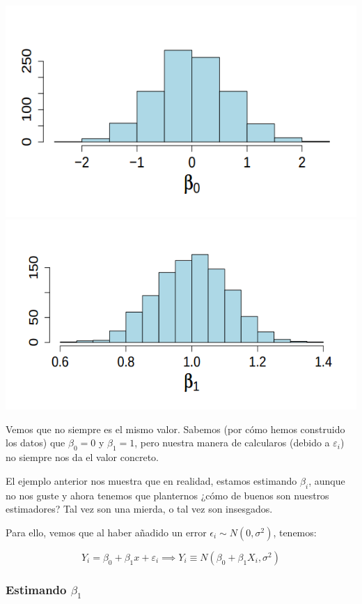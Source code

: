 \documentclass[palatino,nochap]{apuntes}
\begin{document}
\begin{example}
\begin{center}
\includegraphics[scale=0.3]{img/1000vecesb0.png}
\includegraphics[scale=0.3]{img/1000vecesb1.png}
\end{center}

Vemos que no siempre es el mismo valor. Sabemos (por cómo hemos construido los datos) que $β_0 = 0$ y $β_1 = 1$, pero nuestra manera de calcularos (debido a $ε_i$) no siempre nos da el valor concreto.


\end{example}

El ejemplo anterior nos muestra que en realidad, estamos estimando $β_i$, aunque no nos guste y ahora tenemos que planternos ¿cómo de buenos son nuestros estimadores? Tal vez son una mierda, o tal vez son insesgados.

Para ello, vemos que al haber añadido un error $\epsilon_i \sim N(0,σ^2)$, tenemos:

\[
Y_i = β_0 + β_1x + ε_i \implies Y_i \equiv N(β_0 + β_1X_i, σ^2)
\]


\subsubsection{Estimando $β_1$}
\end{document}
